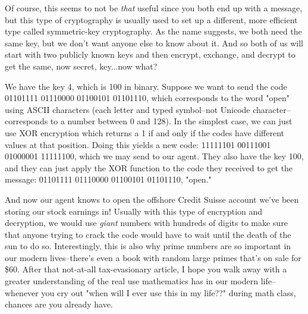 \documentclass{article}
\begin{document}
Of course, this seems to not be \textit{that} useful since you both end up with a message, but this type of cryptography is usually used to set up a different, more efficient type called symmetric-key cryptography. As the name suggests, we both need the same key, but we don't want anyone else to know about it. And so both of us will start with two publicly known keys and then encrypt, exchange, and decrypt to get the same, now secret, key...now what?

We have the key 4, which is 100 in binary. Suppose we want to send the code 01101111 01110000 01100101 01101110, which corresponds to the word "open" using ASCII characters (each letter and typed symbol--not Unicode character--corresponds to a number between 0 and 128). In the simplest case, we can just use XOR encryption which returns a 1 if and only if the codes have different values at that position. Doing this yields a new code: 11111101 00111001 01000001 11111100, which we may send to our agent. They also have the key 100, and they can just apply the XOR function to the code they received to get the message: 01101111 01110000 01100101 01101110, "open."

And now our agent knows to open the offshore Credit Suisse account we've been storing our stock earnings in! Usually with this type of encryption and decryption, we would use \textit{giant} numbers with hundreds of digits to make sure that anyone trying to crack the code would have to wait until the death of the sun to do so. Interestingly, this is also why prime numbers are so important in our modern lives--there's even a book with random large primes that's on sale for \$60. After that not-at-all tax-evasionary article, I hope you walk away with a greater understanding of the real use mathematics has in our modern life--whenever you cry out "when will I ever use this in my life??" during math class, chances are you already have.
\end{document}
